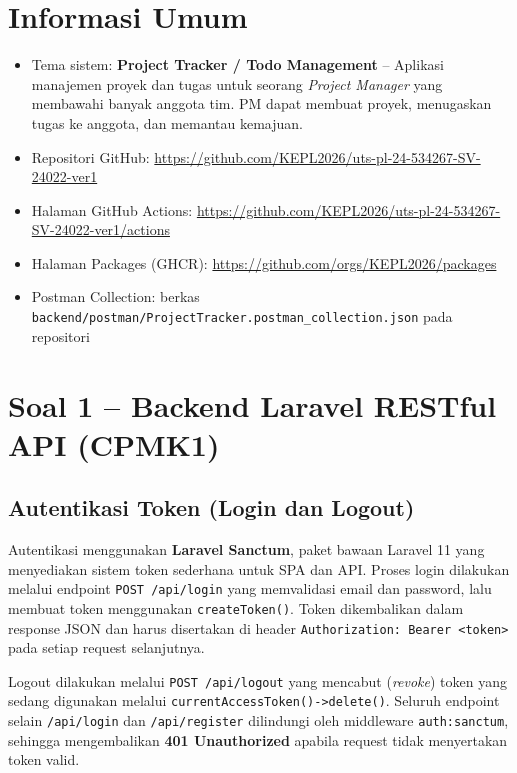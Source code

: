 \documentclass[12pt,letterpaper]{report}
\begin{document}
\section{Informasi Umum}
\begin{itemize}[label=--]
    \item Tema sistem: \textbf{Project Tracker / Todo Management} -- Aplikasi manajemen proyek dan tugas untuk seorang \textit{Project Manager} yang membawahi banyak anggota tim. PM dapat membuat proyek, menugaskan tugas ke anggota, dan memantau kemajuan.
    \item Repositori GitHub: \url{https://github.com/KEPL2026/uts-pl-24-534267-SV-24022-ver1}
    \item Halaman GitHub Actions: \url{https://github.com/KEPL2026/uts-pl-24-534267-SV-24022-ver1/actions}
    \item Halaman Packages (GHCR): \url{https://github.com/orgs/KEPL2026/packages}
    \item Postman Collection: berkas \texttt{backend/postman/ProjectTracker.postman\_collection.json} pada repositori
\end{itemize}

\section{Soal 1 -- Backend Laravel RESTful API (CPMK1)}

\subsection{Autentikasi Token (Login dan Logout)}
Autentikasi menggunakan \textbf{Laravel Sanctum}, paket bawaan Laravel 11 yang menyediakan sistem token sederhana untuk SPA dan API. Proses login dilakukan melalui endpoint \texttt{POST /api/login} yang memvalidasi email dan password, lalu membuat token menggunakan \texttt{createToken()}. Token dikembalikan dalam response JSON dan harus disertakan di header \texttt{Authorization: Bearer <token>} pada setiap request selanjutnya.

Logout dilakukan melalui \texttt{POST /api/logout} yang mencabut (\textit{revoke}) token yang sedang digunakan melalui \texttt{currentAccessToken()->delete()}. Seluruh endpoint selain \texttt{/api/login} dan \texttt{/api/register} dilindungi oleh middleware \texttt{auth:sanctum}, sehingga mengembalikan \textbf{401 Unauthorized} apabila request tidak menyertakan token valid.
\end{document}
